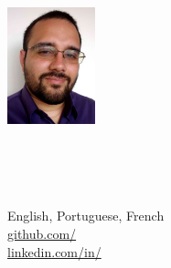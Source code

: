 


\begin{minipage}{1.1in}
  \centering \includegraphics[width=1in]{photo}
\end{minipage}
\begin{minipage}{\dimexpr(\textwidth-1.2in)}
  \begin{minipage}{.7\linewidth}
    \centering
    {\Huge \skills \name} \\
    {\color{highlight} \Large{\role}} \vspace{2em}
  \end{minipage}
  \begin{minipage}{.3\linewidth}
    \raggedleft
    \begin{small}
      \faHome \enspace \address \\
      \faPhone \enspace \phone \\
      \faEnvelope \enspace \href{mailto:\email}{\email} \\
      \faLanguage \enspace English, Portuguese, French \\
      \faGithub \enspace \href{https://github.com/\github}{github.com/\github} \\
      \faLinkedin \enspace \href{https://www.linkedin.com/in/\LinkedIn}{linkedin.com/in/\LinkedIn}
    \end{small}
  \end{minipage}
  \enskip
  {\color{highlight}\hrulefill}
  
\end{minipage}
